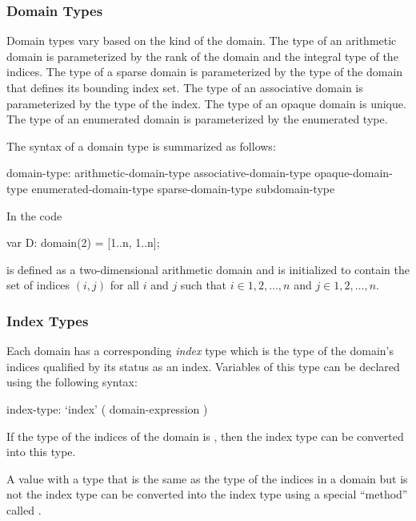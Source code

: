 \subsubsection{Domain Types}
\label{Domain_Types}

Domain types vary based on the kind of the domain.  The type of an
arithmetic domain is parameterized by the rank of the domain and the
integral type of the indices.  The type of a sparse domain is
parameterized by the type of the domain that defines its bounding
index set.  The type of an associative domain is parameterized by the
type of the index.  The type of an opaque domain is unique.  The type
of an enumerated domain is parameterized by the enumerated type.

The syntax of a domain type is summarized as follows:
\begin{syntax}
domain-type:
  arithmetic-domain-type
  associative-domain-type
  opaque-domain-type
  enumerated-domain-type
  sparse-domain-type
  subdomain-type
\end{syntax}  

\begin{example}
In the code
\begin{chapel}
var D: domain(2) = [1..n, 1..n];
\end{chapel}
 is defined as a two-dimensional arithmetic domain and is
initialized to contain the set of indices $(i,j)$ for all $i$ and $j$
such that $i \in {1, 2, \ldots, n}$ and $j \in {1, 2, \ldots, n}$.
\end{example}

\subsubsection{Index Types}
\label{Index_Types}

Each domain has a corresponding \emph{index} type which is the type of
the domain's indices qualified by its status as an index.  Variables
of this type can be declared using the following syntax:
\begin{syntax}
index-type:
  `index' ( domain-expression )
\end{syntax}
If the type of the indices of the domain is , then the index
type can be converted into this type.

A value with a type that is the same as the type of the indices in a
domain but is not the index type can be converted into the index type
using a special ``method'' called .

